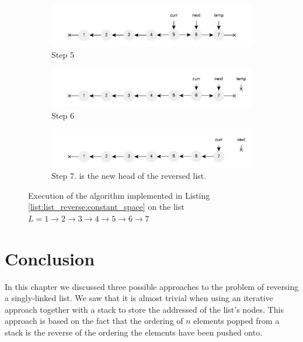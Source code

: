 \begin{figure}
\begin{subfigure}[t]{0.49\textwidth}
	 \end{subfigure}
	 \hfill
	 \begin{subfigure}[t]{0.49\textwidth}
		\centering
		\includegraphics[width=\textwidth]{sources/list_reverse/images/list_reverse_iterative5}
		\caption[]{Step $5$}
		\label{fig:list_reverse:list_reverse_iterative1}
	 \end{subfigure}
	 \hfill
	 \begin{subfigure}[t]{0.49\textwidth}
		\centering
		\includegraphics[width=\textwidth]{sources/list_reverse/images/list_reverse_iterative6}
		\caption[]{Step $6$}
		\label{fig:list_reverse:list_reverse_iterative1}
	 \end{subfigure}
	 \hfill
	 \begin{subfigure}[t]{0.49\textwidth}
		\centering
		\includegraphics[width=\textwidth]{sources/list_reverse/images/list_reverse_iterative7}
		\caption[]{Step $7$.  is the new head of the reversed list.}
		\label{fig:list_reverse:list_reverse_iterative7}
	 \end{subfigure}
\caption{Execution of the algorithm implemented in Listing \ref{list:list_reverse:constant_space} on the list $L = 1 \rightarrow 2 \rightarrow 3 \rightarrow 4 \rightarrow 5 \rightarrow 6 \rightarrow 7$}
\label{fig:list_reverse:list_reverse_iterative_execution}
\end{figure}

\section{Conclusion}
In this chapter we discussed three possible approaches to the problem of reversing a singly-linked list.
We saw that it is almost trivial when using an iterative approach together with a stack to store the addressed of the list's nodes. 
This approach is based on the fact that the ordering of $n$  elements popped from a stack is the reverse of the ordering the elements have been pushed onto.

